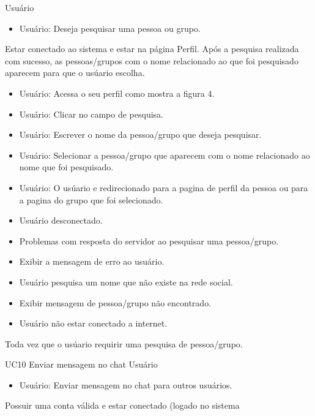 {Usuário}
{
\begin{itemize}
	\item Usuário: Deseja pesquisar uma pessoa ou grupo.	
\end{itemize}
}
{Estar conectado ao sistema e estar na página Perfil.}
{Após a pesquisa realizada com sucesso, as pessoas/grupos com o nome relacionado ao que foi pesquisado aparecem para que o usúario escolha.}
{
\begin{itemize}
	\item Usuário: Acessa o seu perfil como mostra a figura 4.
	\item Usuário: Clicar no campo de pesquisa.
	\item Usuário: Escrever o nome da pessoa/grupo que deseja pesquisar.
	\item Usuário: Selecionar a pessoa/grupo que aparecem com o nome relacionado ao nome que foi pesquisado.
	\item Usuário: O usúario e redirecionado para a pagina de perfil da pessoa ou para a pagina do grupo que foi selecionado.
\end{itemize}
}
{
\begin{itemize}
	\item Usuário desconectado.
	\item Problemas com resposta do servidor ao pesquisar uma pessoa/grupo.
	\item Exibir a mensagem de erro ao usuário.
	\item Usuário pesquisa um nome que não existe na rede social.
	\item Exibir mensagem de pessoa/grupo não encontrado.
	\item Usuário não estar conectado a internet.
\end{itemize}
}
{Toda vez que o usúario requirir uma pesquisa de pessoa/grupo.}
{

}
\casoDeUso
{UC10}
{Enviar mensagem no chat}
{Usuário}
{
\begin{itemize}
	\item Usuário: Enviar mensagem no chat para outros usuários.
	
\end{itemize}

}
 {Possuir uma conta válida e estar conectado (logado no sistema}
